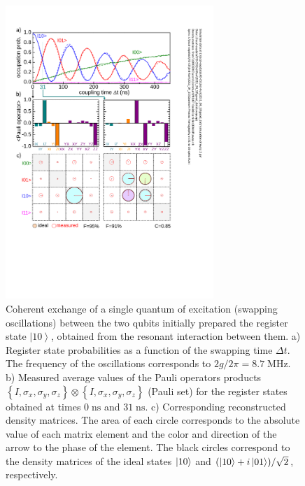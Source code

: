 %
\begin{figure}
\centering \includegraphics[width=0.7\textwidth]{./material/papers/iswap/submission1/Dewes_Figure2}
\caption[Generating entangled two-qubit states by swapping interaction]{Coherent exchange of a single quantum of excitation
(swapping oscillations) between the two qubits initially prepared
the register state $\left|10\right\rangle $, obtained from the resonant
interaction between them. a) Register state probabilities
as a function of the swapping time $\Delta t$. The frequency of
the oscillations corresponds to $2g/2\pi=8.7\;\mathrm{MHz}$. b) Measured
average values of the Pauli operators products $\left\{ I,\sigma_{x},\sigma_{y},\sigma_{z}\right\} \otimes\left\{ I,\sigma_{x},\sigma_{y},\sigma_{z}\right\} $
(Pauli set) for the register states obtained at times $0\;\mathrm{ns}$
and $31\;\mathrm{ns}$. c) Corresponding reconstructed
density matrices. The area of each circle corresponds
to the absolute value of each matrix element and the color and direction
of the arrow to the phase of the element. The black circles correspond
to the density matrices of the ideal states $\left| 10 \right>$ and $(\left| 10 \right>+i\left| 01 \right>)/\sqrt{2}$,
respectively.}


\label{fig:swap_interaction_state_tomography} %
\end{figure}


